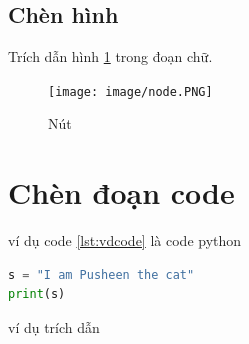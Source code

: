 \subsection{Chèn hình}

Trích dẫn hình \ref{fig:node} trong đoạn chữ. 

\begin{figure}[h]
\centering
\texttt{[image: image/node.PNG]}
\caption{\label{fig:node} Nút}
\end{figure}


\section{Chèn đoạn code}


ví dụ code \ref{lst:vdcode} là code python 


\begin{lstlisting}[caption={Đoạn code}, label={lst:vdcode}, language=python]
s = "I am Pusheen the cat"
print(s)
\end{lstlisting}

ví dụ trích dẫn \cite{robinson2013graph}












